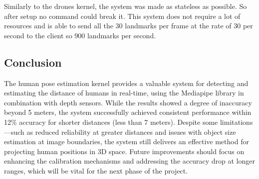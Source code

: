 Similarly to the drones kernel, the system was made as stateless as possible. So after setup no command could break it. This system does not require a lot of resources and is able to send all the 30 landmarks per frame at the rate of 30 per second to the client so 900 landmarks per second.

\subsection{Conclusion} 
The human pose estimation kernel provides a valuable system for detecting and estimating the distance of humans in real-time, using the Mediapipe library in combination with depth sensors. While the results showed a degree of inaccuracy beyond 5 meters, the system successfully achieved consistent performance within 12\% accuracy for shorter distances (less than 7 meters). Despite some limitations—such as reduced reliability at greater distances and issues with object size estimation at image boundaries, the system still delivers an effective method for projecting human positions in \gls{3D} space. Future improvements should focus on enhancing the calibration mechanisms and addressing the accuracy drop at longer ranges, which will be vital for the next phase of the project.